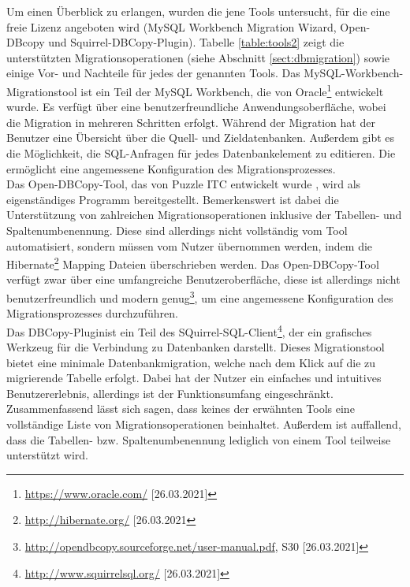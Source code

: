 Um einen Überblick zu erlangen, wurden die jene Tools untersucht, für die eine freie Lizenz angeboten wird (MySQL Workbench Migration Wizard, Open-DBcopy und Squirrel-DBCopy-Plugin). Tabelle \ref{table:tools2} zeigt die unterstützten Migrationsoperationen (siehe Abschnitt \ref{sect:dbmigration}) sowie einige Vor- und Nachteile für jedes der genannten Tools. 
Das MySQL-Workbench-Migrationstool ist ein Teil der MySQL Workbench, die von Oracle\footnote{\url{https://www.oracle.com/} [26.03.2021]} entwickelt wurde. Es verfügt über eine benutzerfreundliche Anwendungsoberfläche, wobei die Migration in mehreren Schritten erfolgt. Während der Migration hat der Benutzer eine Übersicht über die Quell- und Zieldatenbanken. Außerdem gibt es die Möglichkeit, die SQL-Anfragen für jedes Datenbankelement zu editieren. Die ermöglicht eine angemessene Konfiguration des Migrationsprozesses. \\
Das Open-DBCopy-Tool, das von Puzzle ITC entwickelt wurde \footnotemark[5], wird als eigenständiges Programm bereitgestellt. Bemerkenswert ist dabei die Unterstützung von zahlreichen Migrationsoperationen inklusive der Tabellen- und Spaltenumbenennung. Diese sind allerdings nicht vollständig vom Tool automatisiert, sondern müssen vom Nutzer übernommen werden, indem die Hibernate\footnote{\url{http://hibernate.org/} [26.03.2021} Mapping Dateien überschrieben werden. Das Open-DBCopy-Tool verfügt zwar über eine umfangreiche Benutzeroberfläche, diese ist allerdings nicht benutzerfreundlich und modern genug\footnote{\url{http://opendbcopy.sourceforge.net/user-manual.pdf}, S30 [26.03.2021]}, um eine angemessene Konfiguration des Migrationsprozesses durchzuführen. \\
Das DBCopy-Plugin\footnotemark[6] ist ein Teil des SQuirrel-SQL-Client\footnote{\url{http://www.squirrelsql.org/} [26.03.2021]}, der ein  grafisches Werkzeug für die Verbindung zu Datenbanken darstellt. Dieses Migrationstool bietet eine minimale Datenbankmigration, welche nach dem Klick auf die zu migrierende Tabelle erfolgt. Dabei hat der Nutzer ein einfaches und intuitives Benutzererlebnis, allerdings ist der Funktionsumfang eingeschränkt.\\
Zusammenfassend lässt sich sagen, dass keines der erwähnten Tools eine vollständige Liste von Migrationsoperationen beinhaltet. Außerdem ist auffallend, dass die Tabellen- bzw. Spaltenumbenennung lediglich von einem Tool teilweise unterstützt wird.
